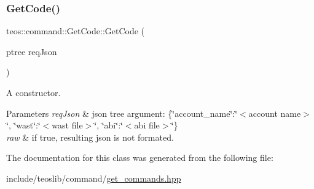 \subsubsection{\texorpdfstring{Get\+Code()}{GetCode()}\hspace{0.1cm}{\footnotesize\ttfamily [2/2]}}
{\footnotesize\ttfamily teos\+::command\+::\+Get\+Code\+::\+Get\+Code (\begin{DoxyParamCaption}\item[{ptree}]{req\+Json }\end{DoxyParamCaption})\hspace{0.3cm}{\ttfamily [inline]}}



A constructor. 


\begin{DoxyParams}{Parameters}
{\em req\+Json} & json tree argument\+: \{\char`\"{}account\+\_\+name\char`\"{}\+:\char`\"{}$<$account name$>$\char`\"{}, \char`\"{}wast\char`\"{}\+:\char`\"{}$<$wast file$>$\char`\"{}, \char`\"{}abi\char`\"{}\+:\char`\"{}$<$abi file$>$\char`\"{}\} \\
\hline
{\em raw} & if true, resulting json is not formated. \\
\hline
\end{DoxyParams}


The documentation for this class was generated from the following file\+:\begin{DoxyCompactItemize}
\item 
include/teoslib/command/\mbox{\hyperlink{get__commands_8hpp}{get\+\_\+commands.\+hpp}}\end{DoxyCompactItemize}
